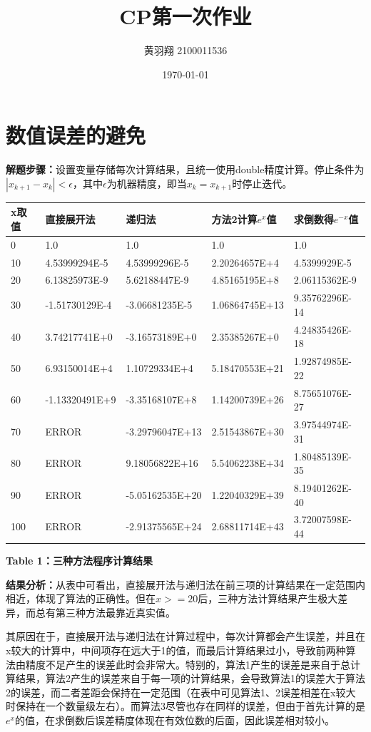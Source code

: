 \documentclass{article}
\title{\huge{\textbf{CP第一次作业}}}
\author{黄羽翔 2100011536}
\date{\today}
\begin{document}
\large
\maketitle

\section{数值误差的避免}
\textbf{解题步骤：}设置变量存储每次计算结果，且统一使用double精度计算。停止条件为$|x_{k+1}-x_k|<\epsilon$，其中$\epsilon$为机器精度，即当$x_k=x_{k+1}$时停止迭代。\par

\renewcommand\arraystretch{1.2}
\begin{center}
\begin{tabular}{m{1.6cm}<{\centering}|m{3.2cm}<{\centering}|m{3.2cm}<{\centering}|m{3.2cm}<{\centering}|m{3.2cm}<{\centering}}
\hline
x取值&直接展开法&递归法&方法2计算$e^x$值&求倒数得$e^{-x}$值\\ \hline
0&1.0&1.0&1.0&1.0\\ 
10&4.53999294E-5&4.53999296E-5&2.20264657E+4&4.5399929E-5\\ 
20&6.13825973E-9&5.62188447E-9&4.85165195E+8&2.06115362E-9\\
30&-1.51730129E-4&-3.06681235E-5&1.06864745E+13&9.35762296E-14\\
40&3.74217741E+0&-3.16573189E+0&2.35385267E+0&4.24835426E-18\\
50&6.93150014E+4&1.10729334E+4&5.18470553E+21&1.92874985E-22\\
60&-1.13320491E+9&-3.35168107E+8&1.14200739E+26&8.75651076E-27\\
70&ERROR&-3.29796047E+13&2.51543867E+30&3.97544974E-31\\
80&ERROR&9.18056822E+16&5.54062238E+34&1.80485139E-35\\
90&ERROR&-5.05162535E+20&1.22040329E+39&8.19401262E-40\\
100&ERROR&-2.91375565E+24&2.68811714E+43&3.72007598E-44\\
\hline
\end{tabular}
\end{center}
\centerline{\textbf{Table 1：三种方法程序计算结果}}

\textbf{结果分析：}从表中可看出，直接展开法与递归法在前三项的计算结果在一定范围内相近，体现了算法的正确性。但在$x>=20$后，三种方法计算结果产生极大差异，而总有第三种方法最靠近真实值。\par
其原因在于，直接展开法与递归法在计算过程中，每次计算都会产生误差，并且在x较大的计算中，中间项存在远大于1的值，而最后计算结果过小，导致前两种算法由精度不足产生的误差此时会非常大。特别的，算法1产生的误差是来自于总计算结果，算法2产生的误差来自于每一项的计算结果，会导致算法1的误差大于算法2的误差，而二者差距会保持在一定范围（在表中可见算法1、2误差相差在x较大时保持在一个数量级左右）。而算法3尽管也存在同样的误差，但由于首先计算的是$e^{x}$的值，在求倒数后误差精度体现在有效位数的后面，因此误差相对较小。\par
\end{document}

